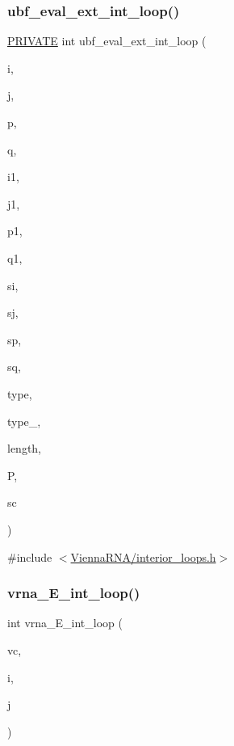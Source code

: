 \subsubsection{\texorpdfstring{ubf\+\_\+eval\+\_\+ext\+\_\+int\+\_\+loop()}{ubf\_eval\_ext\_int\_loop()}}
{\footnotesize\ttfamily \mbox{\hyperlink{group__utils_ga5e151c615eda34903514212f05a5ccf8}{P\+R\+I\+V\+A\+TE}} int ubf\+\_\+eval\+\_\+ext\+\_\+int\+\_\+loop (\begin{DoxyParamCaption}\item[{int}]{i,  }\item[{int}]{j,  }\item[{int}]{p,  }\item[{int}]{q,  }\item[{int}]{i1,  }\item[{int}]{j1,  }\item[{int}]{p1,  }\item[{int}]{q1,  }\item[{short}]{si,  }\item[{short}]{sj,  }\item[{short}]{sp,  }\item[{short}]{sq,  }\item[{unsigned char}]{type,  }\item[{unsigned char}]{type\+\_,  }\item[{int}]{length,  }\item[{\mbox{\hyperlink{group__energy__parameters_ga8a69ca7d787e4fd6079914f5343a1f35}{vrna\+\_\+param\+\_\+t}} $\ast$}]{P,  }\item[{\mbox{\hyperlink{group__soft__constraints_ga75401ce219ef8dbcceb672db82d434c6}{vrna\+\_\+sc\+\_\+t}} $\ast$}]{sc }\end{DoxyParamCaption})}



{\ttfamily \#include $<$\mbox{\hyperlink{interior__loops_8h}{Vienna\+R\+N\+A/interior\+\_\+loops.\+h}}$>$}

\mbox{\label{group__loops_ga8aab34f532276b7e38837d78ef591847}} 
\subsubsection{\texorpdfstring{vrna\+\_\+\+E\+\_\+int\+\_\+loop()}{vrna\_E\_int\_loop()}}
{\footnotesize\ttfamily int vrna\+\_\+\+E\+\_\+int\+\_\+loop (\begin{DoxyParamCaption}\item[{\mbox{\hyperlink{group__fold__compound_ga1b0cef17fd40466cef5968eaeeff6166}{vrna\+\_\+fold\+\_\+compound\+\_\+t}} $\ast$}]{vc,  }\item[{int}]{i,  }\item[{int}]{j }\end{DoxyParamCaption})}




